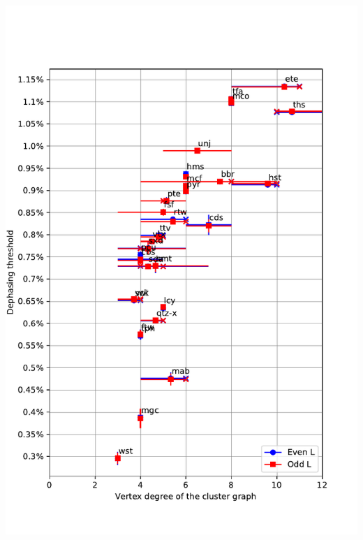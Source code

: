 \documentclass[pra]{revtex4-1}
\begin{document}
\begin{center}
\includegraphics[width=.8\textwidth]{../graphs-paper2/thresholds-dephasing-cluster.pdf} \clearpage 

\clearpage

\end{center}
\end{document}
